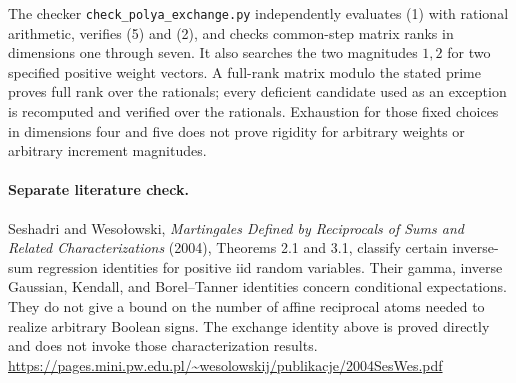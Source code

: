 \documentclass[11pt]{article}
\begin{document}
The checker \texttt{check\_polya\_exchange.py} independently
evaluates (1) with rational arithmetic, verifies (5) and (2), and
checks common-step matrix ranks in dimensions one through seven.
It also searches the two magnitudes $1,2$ for two specified positive
weight vectors. A full-rank matrix modulo the stated prime proves
full rank over the rationals; every deficient candidate used as an
exception is recomputed and verified over the rationals. Exhaustion
for those fixed choices in dimensions four and five does not prove
rigidity for arbitrary weights or arbitrary increment magnitudes.

\paragraph{Separate literature check.}
Seshadri and Weso\l{}owski, \emph{Martingales Defined by Reciprocals
of Sums and Related Characterizations} (2004), Theorems 2.1 and 3.1,
classify certain inverse-sum regression identities for positive iid
random variables. Their gamma, inverse Gaussian, Kendall, and
Borel--Tanner identities concern conditional expectations. They do
not give a bound on the number of affine reciprocal atoms needed
to realize arbitrary Boolean signs. The exchange identity above
is proved directly and does not invoke those characterization results.
\url{https://pages.mini.pw.edu.pl/~wesolowskij/publikacje/2004SesWes.pdf}
\end{document}
